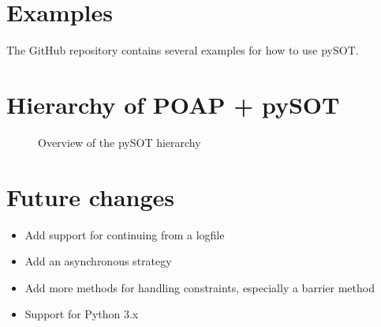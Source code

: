 \documentclass[]{article}
\begin{document}
\section{Examples}
The GitHub repository contains several examples for how to use pySOT.

\section{Hierarchy of POAP + pySOT}
\begin{figure}[!ht] 
	\centering
	\caption{Overview of the pySOT hierarchy} 
\end{figure}
\FloatBarrier

\section{Future changes}
\begin{itemize}
\item Add support for continuing from a logfile
\item Add an asynchronous strategy
\item Add more methods for handling constraints, especially a barrier method
\item Support for Python 3.x
\end{itemize}



\end{document}
